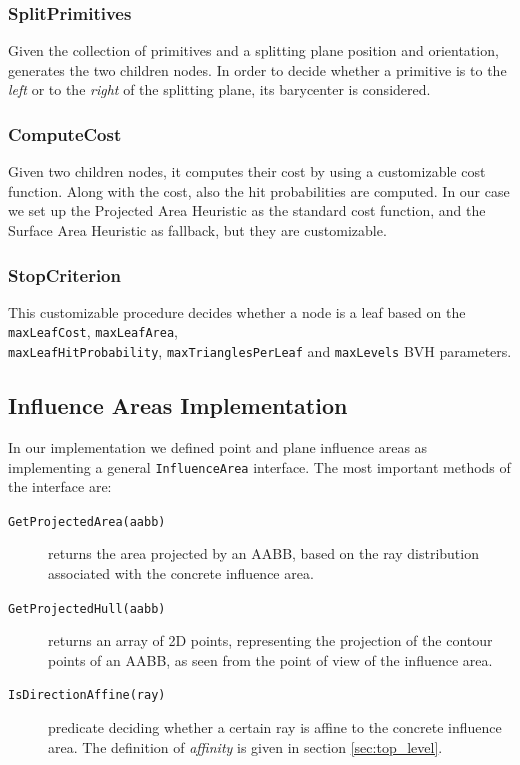 \documentclass[acmtog, anonymous, review]{acmart}
\begin{document}
\subsubsection{SplitPrimitives}
Given the collection of primitives and a splitting plane position and orientation, generates the two children nodes. In order to decide whether a primitive is to the \textit{left} or to the \textit{right} of the splitting plane, its barycenter is considered.

\subsubsection{ComputeCost}
Given two children nodes, it computes their cost by using a customizable cost function. Along with the cost, also the hit probabilities are computed. In our case we set up the Projected Area Heuristic as the standard cost function, and the Surface Area Heuristic as fallback, but they are customizable.

\subsubsection{StopCriterion}
This customizable procedure decides whether a node is a leaf based on the \texttt{maxLeafCost}, \texttt{maxLeafArea}, \\\texttt{maxLeafHitProbability}, \texttt{maxTrianglesPerLeaf} and \texttt{maxLevels} BVH parameters.

\subsection{Influence Areas Implementation}
In our implementation we defined point and plane influence areas as implementing a general \texttt{InfluenceArea} interface. The most important methods of the interface are:

\begin{description}
  \item[\texttt{GetProjectedArea(aabb)}] returns the area projected by an AABB, based on the ray distribution associated with the concrete influence area.
  \item[\texttt{GetProjectedHull(aabb)}] returns an array of 2D points, representing the projection of the contour points of an AABB, as seen from the point of view of the influence area.
  \item[\texttt{IsDirectionAffine(ray)}] predicate deciding whether a certain ray is affine to the concrete influence area. The definition of \textit{affinity} is given in section \ref{sec:top_level}. 
\end{description}
\end{document}
